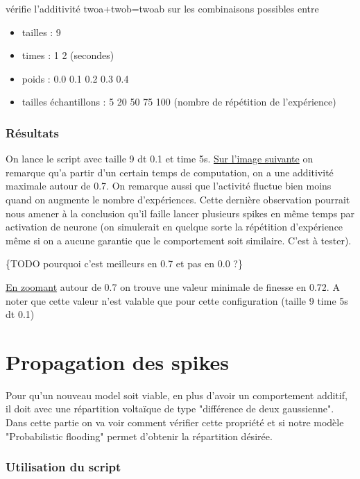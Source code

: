 \documentclass{report}
\begin{document}
vérifie l'additivité twoa+twob=twoab sur les combinaisons possibles entre\\

\begin{itemize}
	\item tailles : 9
	\item times : 1 2 (secondes)
	\item poids : 0.0 0.1 0.2 0.3 0.4
	\item tailles échantillons : 5 20 50 75 100 (nombre de répétition de l'expérience)
\end{itemize}

\section{Résultats}

On lance le script avec taille 9 dt 0.1 et time 5s.
\href{run:images/additivite2.png}{Sur l'image suivante} on remarque qu'a partir d'un certain temps de computation, on a une additivité maximale autour de 0.7. On remarque aussi que l'activité fluctue bien moins quand on augmente le nombre d'expériences. Cette dernière observation pourrait nous amener à la conclusion qu'il faille lancer plusieurs spikes en même temps par activation de neurone (on simulerait en quelque sorte la répétition d'expérience même si on a aucune garantie que le comportement soit similaire. C'est à tester).

{\color{red}\{TODO pourquoi c'est meilleurs en 0.7 et pas en 0.0 ?\}}

\href{run:images/additivite3.png}{En zoomant} autour de 0.7 on trouve une valeur minimale de finesse en 0.72.
A noter que cette valeur n'est valable que pour cette configuration (taille 9 time 5s dt 0.1)


\part{Propagation des spikes}

Pour qu'un nouveau model soit viable, en plus d'avoir un comportement additif, il doit avec une répartition voltaïque de type "différence de deux gaussienne". Dans cette partie on va voir comment vérifier cette propriété et si notre modèle "Probabilistic flooding" permet d'obtenir la répartition désirée.

\section{Utilisation du script}
\end{document}
